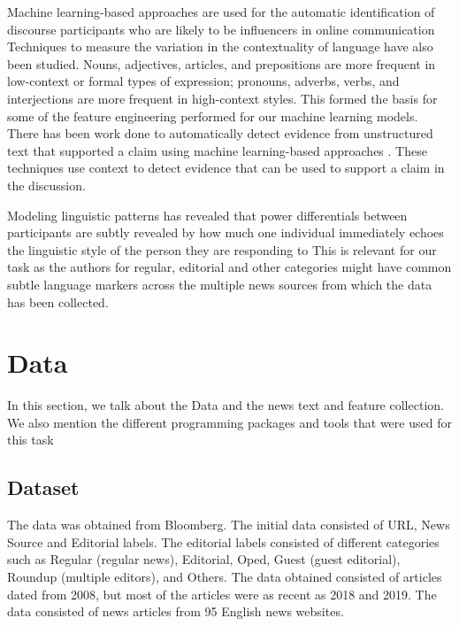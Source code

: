 \documentclass[11pt]{article}
\begin{document}
Machine learning-based approaches are used for the automatic identification of discourse participants who are likely to be influencers in online communication \cite{biran2012detecting} Techniques to measure the variation in the contextuality of language \cite{heylighen2002variation} have also been studied. Nouns, adjectives, articles, and prepositions are more frequent in low-context or formal types of expression; pronouns, adverbs, verbs, and interjections are more frequent in high-context styles. This formed the basis for some of the feature engineering performed for our machine learning models. There has been work done to automatically detect evidence from unstructured text that supported a claim using machine learning-based approaches \cite{rinott2015show}. These techniques use context to detect evidence that can be used to support a claim in the discussion. 

Modeling linguistic patterns has revealed that power differentials between participants are subtly revealed by how much one individual immediately echoes the linguistic style of the person they are responding to \cite{danescu2012echoes} This is relevant for our task as the authors for regular, editorial and other categories might have common subtle language markers across the multiple news sources from which the data has been collected.   




\section{Data}
\label{sec:datacol}

In this section, we talk about the Data and the news text and feature collection. We also mention the different programming packages and tools that were used for this task

\subsection{Dataset}

The data was obtained from Bloomberg. The initial data consisted of URL, News Source and Editorial labels. The editorial labels consisted of different categories such as  Regular (regular news), Editorial, Oped, Guest (guest editorial), Roundup (multiple editors), and Others. The data obtained consisted of articles dated from 2008, but most of the articles were as recent as 2018 and 2019. The data consisted of news articles from 95 English news websites. 
\end{document}

